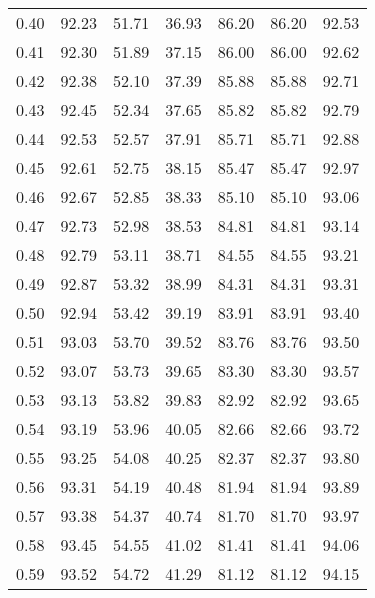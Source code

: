 \begin{tabular}{|c|c|c|c|c|c|c|}
      0.40 &     92.23 &     51.71 &      36.93 &   86.20 &      86.20 &         92.53 \\
      0.41 &     92.30 &     51.89 &      37.15 &   86.00 &      86.00 &         92.62 \\
      0.42 &     92.38 &     52.10 &      37.39 &   85.88 &      85.88 &         92.71 \\
      0.43 &     92.45 &     52.34 &      37.65 &   85.82 &      85.82 &         92.79 \\
      0.44 &     92.53 &     52.57 &      37.91 &   85.71 &      85.71 &         92.88 \\
      0.45 &     92.61 &     52.75 &      38.15 &   85.47 &      85.47 &         92.97 \\
      0.46 &     92.67 &     52.85 &      38.33 &   85.10 &      85.10 &         93.06 \\
      0.47 &     92.73 &     52.98 &      38.53 &   84.81 &      84.81 &         93.14 \\
      0.48 &     92.79 &     53.11 &      38.71 &   84.55 &      84.55 &         93.21 \\
      0.49 &     92.87 &     53.32 &      38.99 &   84.31 &      84.31 &         93.31 \\
      0.50 &     92.94 &     53.42 &      39.19 &   83.91 &      83.91 &         93.40 \\
      0.51 &     93.03 &     53.70 &      39.52 &   83.76 &      83.76 &         93.50 \\
      0.52 &     93.07 &     53.73 &      39.65 &   83.30 &      83.30 &         93.57 \\
      0.53 &     93.13 &     53.82 &      39.83 &   82.92 &      82.92 &         93.65 \\
      0.54 &     93.19 &     53.96 &      40.05 &   82.66 &      82.66 &         93.72 \\
      0.55 &     93.25 &     54.08 &      40.25 &   82.37 &      82.37 &         93.80 \\
      0.56 &     93.31 &     54.19 &      40.48 &   81.94 &      81.94 &         93.89 \\
      0.57 &     93.38 &     54.37 &      40.74 &   81.70 &      81.70 &         93.97 \\
      0.58 &     93.45 &     54.55 &      41.02 &   81.41 &      81.41 &         94.06 \\
      0.59 &     93.52 &     54.72 &      41.29 &   81.12 &      81.12 &         94.15 \\

\end{tabular}
